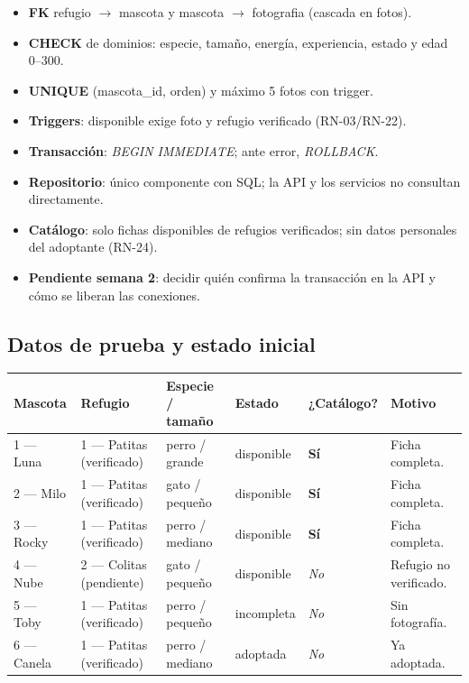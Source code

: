 \documentclass[11pt,a4paper]{article}
\newcommand{\thead}[1]{\textbf{#1}}
\begin{document}
\noindent
\begin{minipage}[t]{0.49\linewidth}
\begin{itemize}
\item \textbf{FK} refugio $\rightarrow$ mascota y mascota $\rightarrow$ fotografia (cascada en fotos).
\item \textbf{CHECK} de dominios: especie, tamaño, energía, experiencia, estado y edad 0--300.
\item \textbf{UNIQUE} (mascota\_id, orden) y máximo 5 fotos con trigger.
\item \textbf{Triggers}: disponible exige foto y refugio verificado (RN-03/RN-22).
\end{itemize}
\end{minipage}\hfill
\begin{minipage}[t]{0.49\linewidth}
\begin{itemize}
\item \textbf{Transacción}: \emph{BEGIN IMMEDIATE}; ante error, \emph{ROLLBACK}.
\item \textbf{Repositorio}: único componente con SQL; la API y los servicios no consultan directamente.
\item \textbf{Catálogo}: solo fichas disponibles de refugios verificados; sin datos personales del adoptante (RN-24).
\item \textbf{Pendiente semana 2}: decidir quién confirma la transacción en la API y cómo se liberan las conexiones.
\end{itemize}
\end{minipage}

\clearpage

\subsection{Datos de prueba y estado inicial}

{\footnotesize
\begin{tabularx}{\linewidth}{@{}V{0.8}V{1.2}V{0.9}V{0.75}Z{0.8}V{1.55}@{}}
\toprule

\thead{Mascota} & \thead{Refugio} & \thead{Especie / tamaño} & \thead{Estado} & \thead{¿Catálogo?} & \thead{Motivo} \\ \midrule

1 --- Luna & 1 --- Patitas (verificado) & perro / grande & disponible & \textbf{Sí} & Ficha completa. \\
2 --- Milo & 1 --- Patitas (verificado) & gato / pequeño & disponible & \textbf{Sí} & Ficha completa. \\
3 --- Rocky & 1 --- Patitas (verificado) & perro / mediano & disponible & \textbf{Sí} & Ficha completa. \\
4 --- Nube & 2 --- Colitas (pendiente) & gato / pequeño & disponible & \textit{No} & Refugio no verificado. \\
5 --- Toby & 1 --- Patitas (verificado) & perro / pequeño & incompleta & \textit{No} & Sin fotografía. \\
6 --- Canela & 1 --- Patitas (verificado) & perro / mediano & adoptada & \textit{No} & Ya adoptada. \\
\bottomrule
\end{tabularx}
}
\end{document}
